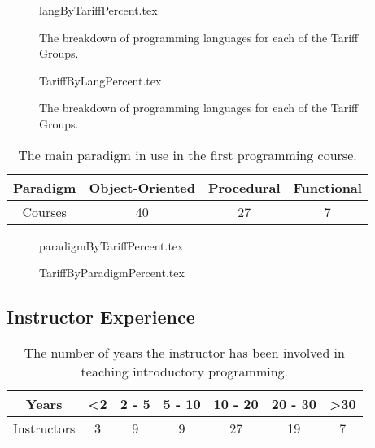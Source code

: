 \documentclass{sig-alternate}
\begin{document}
\begin{figure}
\begin{center}
{langByTariffPercent.tex}
\end{center}
\caption{The breakdown of programming languages for each of the Tariff Groups.}
\end{figure}

\begin{figure}
\begin{center}
{TariffByLangPercent.tex}
\end{center}
\caption{The breakdown of programming languages for each of the Tariff Groups.}
\end{figure}


\begin{table}[]
\centering
\caption{The main paradigm in use in the first programming course.}
\label{tab:paradigm}
\begin{tabular}{cccc}
\hline
Paradigm & Object-Oriented & Procedural & Functional \\ \hline
Courses  & 40              & 27         & 7          \\ \hline
\end{tabular}
\end{table}

\begin{figure}
\begin{center}
{paradigmByTariffPercent.tex}
\end{center}
\caption{}
\end{figure}

\begin{figure}
\begin{center}
{TariffByParadigmPercent.tex}
\end{center}
\caption{}
\end{figure}

\subsection{Instructor Experience}

\begin{table}[]
\centering
\caption{The number of years the instructor has been involved in teaching introductory programming.}
\label{tab:yearsTeaching}
\begin{tabular}{ccccccc}
\hline
Years       & \textless 2 & 2 - 5 & 5 - 10 & 10 - 20 & 20 - 30 & \textgreater 30 \\ \hline
Instructors & 3          & 9     & 9      & 27      & 19      & 7              \\ \hline
\end{tabular}
\end{table}
\end{document}
